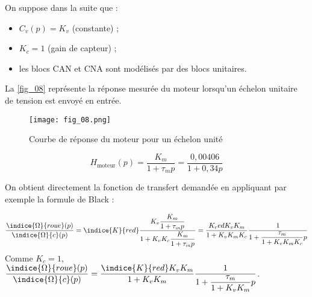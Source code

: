 \ifprof
\else
On suppose dans la suite que :
\begin{itemize}
\item $C_v ( p)=K_v$ (constante) ;
\item $K_c =1$ (gain de capteur) ;
\item  les blocs CAN et CNA sont modélisés par des blocs unitaires.
\end{itemize}

La \autoref{fig_08} représente la réponse mesurée du moteur lorsqu’un échelon unitaire de tension est
envoyé en entrée.

\begin{figure}[H]
\centering
\texttt{[image: fig\_08.png]}
\caption{Courbe de réponse du moteur pour un échelon unité\label{fig_08}}
\end{figure}
\fi

\ifprof
\begin{corrige}
$$H_{\text{moteur}} (p)=\dfrac{K_m}{1+\tau_m p}=\dfrac{0,00406}{1+0,34p}$$ 
\end{corrige}
\else
\fi

\ifprof
\begin{corrige}
On obtient directement la fonction de transfert demandée en appliquant par exemple la formule de Black :


$$ \dfrac{\indice{\Omega}{roue}(p)}{\indice{\Omega}{c}(p)} 
= \indice{K}{red} \dfrac{K_v\dfrac{K_m}{1+\tau_m p}}{1+K_vK_c\dfrac{K_m}{1+\tau_m p}}
= \dfrac{K_red K_v K_m}{1+K_v K_m K_c }\dfrac{1}{1+\dfrac{\tau_m}{1+K_v K_m K_c} p}
$$
Comme $K_c=1$, 
$\dfrac{\indice{\Omega}{roue}(p)}{\indice{\Omega}{c} (p)}=\dfrac{\indice{K}{red} K_v K_m}{1+K_v K_m } \dfrac{1}{1+\dfrac{\tau_m}{1+K_v K_m}  p}$.

\end{corrige}
\else
\fi

%
\ifprof
\begin{corrige}
\end{corrige}
\else
\fi

\ifprof
\begin{corrige}
\end{corrige}
\else
\fi






